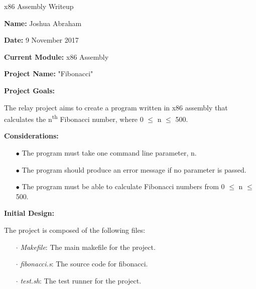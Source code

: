 \documentclass{article}
\begin{document}
\centerline{\sc \large x86 Assembly Writeup}
\vspace{.5pc}

\begin{flushleft}
\textbf{Name:} Joshua Abraham
\vspace{.5pc}

\textbf{Date:} 9 November 2017
\vspace{.5pc}

\textbf{Current Module:} x86 Assembly
\vspace{.5pc}

\textbf{Project Name:} "Fibonacci"
\vspace{.5pc}

\textbf{Project Goals:}
\vspace{.5pc}
\end{flushleft}

The relay project aims to create a program written in x86 assembly that calculates the 
n\textsuperscript{th} Fibonacci number, where 0 $\leq$ n $\leq$	500.
\vspace{.5pc}

\begin{flushleft}
\textbf{Considerations:}
\vspace{.5pc}
\end{flushleft}

\begin{itemize}
	\item[$\bullet$] The program must take one command line parameter, n.
	\item[$\bullet$] The program should produce an error message if no 
	parameter is passed.
	\item[$\bullet$] The program must be able to calculate Fibonacci numbers 
	from 0 $\leq$ n $\leq$ 500.
\end{itemize}
\vspace{.5pc}

\begin{flushleft}
\textbf{Initial Design:}
\vspace{.5pc}
\end{flushleft}

The project is composed of the following files:
\begin{itemize}
	\item [$\cdot$] \textit{Makefile}: The main makefile for the project.
	\item [$\cdot$] \textit{fibonacci.s}: The source code for fibonacci.
	\item [$\cdot$] \textit{test.sh}: The test runner for the project.
\end{itemize}
\vspace{2mm}
\end{document}
